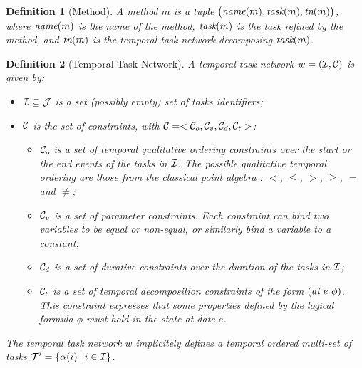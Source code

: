 \documentclass[letterpaper]{article} %
\newtheorem{definition}{Definition}
\newcommand{\at}{\text{\it at}}
\newcommand{\name}{\text{\it name}}
\newcommand{\task}{\text{\it task}}
\newcommand{\tn}{\text{\it tn}}
\begin{document}
\begin{definition}[Method]\label{def:met}
A \emph{method} $m$ is a tuple $\bigl(\name(m), \task(m), \tn(m)\bigr)$, where $\name(m)$ is the name of the method, $\task(m)$ is the task refined by the method, and $\tn(m)$ is the temporal task network decomposing $\task(m)$. %
\end{definition}



\begin{definition}[Temporal Task Network]\label{def:TNN}
A \emph{temporal task network} $w = ({\cal{I}}, {\cal{C}})$ is given by: %
\begin{itemize}

    \item $\cal{I} \subseteq \cal{J}$ is a set (possibly empty) set of tasks identifiers;

    \item $\cal{C}$ is the set of constraints, with ${\cal{C}} = < {\cal{C}}_o, {\cal{C}}_v, {\cal{C}}_d, {\cal{C}}_t >$:
      \begin{itemize}
      \item ${\cal{C}}_o$ is a set of temporal qualitative ordering constraints over the start or the end events of the tasks in $\cal{I}$. The possible qualitative temporal ordering are those from the classical point algebra \cite{broxvall03}: $<$, $\leq$, $>$, $\geq$, $=$ and $\neq$;

      \item ${\cal{C}}_v$ is a set of parameter constraints. Each constraint can bind two variables to be equal or non-equal, or similarly bind a variable to a constant; %

      \item ${\cal{C}}_d$ is a set of durative constraints over the duration of the tasks in $\cal{I}$;

      \item ${\cal{C}}_t$ is a set of temporal decomposition constraints of the form $(\at \ e \ \phi)$. This constraint expresses that some properties defined by the logical formula $\phi$ must hold in the state at date $e$. 
      \end{itemize}
\end{itemize}
The temporal task network $w$ implicitely defines a temporal ordered multi-set of tasks ${\cal{T}}' = \{ \alpha(i) \: | \: i \in {\cal{I}} \}$.
\end{definition}
\end{document}
